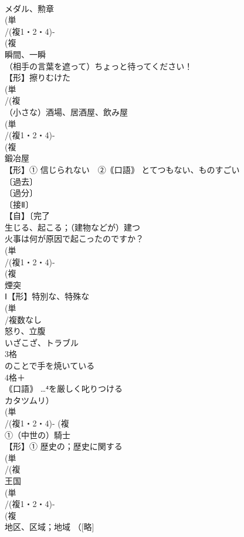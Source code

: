 \documentclass[8pt]{extreport}
\begin{document}
\begin{CJK}{UTF8}{min}
\\	メダル、勲章 
\\	(単
\\	/(複1・2・4)-
\\	(複
\\	瞬間、一瞬 
\\	（相手の言葉を遮って）ちょっと待ってください！
\\	【形】擦りむけた 
\\	(単
\\	/(複
\\	（小さな）酒場、居酒屋、飲み屋 
\\	(単
\\	/(複1・2・4)-
\\	(複
\\	鍛冶屋 
\\	【形】① 信じられない　②｟口語｠ とてつもない、ものすごい
\\	〔過去〕
\\	〔過分〕
\\	〔接Ⅱ〕
\\	【自】〔完了
\\	生じる、起こる；（建物などが）建つ 
\\	火事は何が原因で起こったのですか？
\\	(単
\\	/(複1・2・4)-
\\	(複
\\	煙突 
\\	Ⅰ【形】特別な、特殊な 
\\	(単
\\	/複数なし 
\\	怒り、立腹 
\\	いざこざ、トラブル 
\\	3格 
\\	のことで手を焼いている
\\	4格＋
\\	｟口語｠ …⁴を厳しく叱りつける 
\\	カタツムリ）
\\	(単
\\	/(複1・2・4)- (複
\\	①（中世の）騎士 
\\	【形】① 歴史の；歴史に関する 
\\	(単
\\	/(複
\\	王国 
\\	(単
\\	/(複1・2・4)-
\\	(複
\\	地区、区域；地域 （[略]

\end{CJK}
\end{document}
